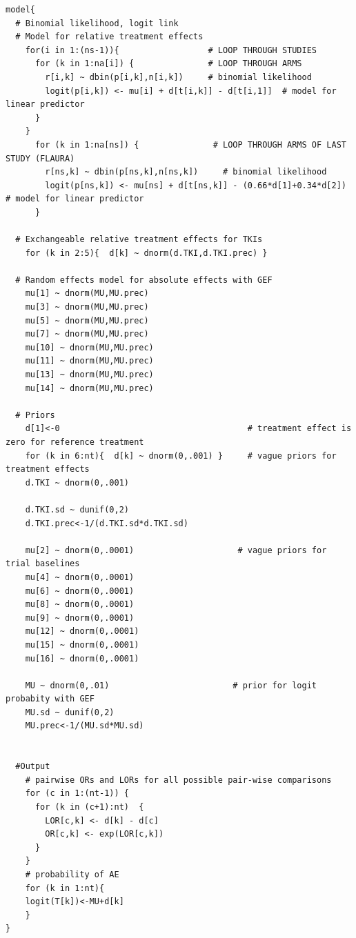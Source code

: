\documentclass[11pt,final,fleqn]{article}\usepackage[]{graphicx}\usepackage[]{color}
\theoremstyle{plain}
\begin{document}
\begin{appendices}
\begin{verbatim}
model{
  # Binomial likelihood, logit link
  # Model for relative treatment effects
    for(i in 1:(ns-1)){                  # LOOP THROUGH STUDIES
      for (k in 1:na[i]) {               # LOOP THROUGH ARMS
        r[i,k] ~ dbin(p[i,k],n[i,k])     # binomial likelihood
        logit(p[i,k]) <- mu[i] + d[t[i,k]] - d[t[i,1]]  # model for linear predictor
      }
    }   
      for (k in 1:na[ns]) {               # LOOP THROUGH ARMS OF LAST STUDY (FLAURA)
        r[ns,k] ~ dbin(p[ns,k],n[ns,k])     # binomial likelihood
        logit(p[ns,k]) <- mu[ns] + d[t[ns,k]] - (0.66*d[1]+0.34*d[2])  # model for linear predictor
      }
  
  # Exchangeable relative treatment effects for TKIs
    for (k in 2:5){  d[k] ~ dnorm(d.TKI,d.TKI.prec) }
  
  # Random effects model for absolute effects with GEF
    mu[1] ~ dnorm(MU,MU.prec) 
    mu[3] ~ dnorm(MU,MU.prec) 
    mu[5] ~ dnorm(MU,MU.prec) 
    mu[7] ~ dnorm(MU,MU.prec) 
    mu[10] ~ dnorm(MU,MU.prec) 
    mu[11] ~ dnorm(MU,MU.prec) 
    mu[13] ~ dnorm(MU,MU.prec) 
    mu[14] ~ dnorm(MU,MU.prec) 
       
  # Priors
    d[1]<-0                                      # treatment effect is zero for reference treatment
    for (k in 6:nt){  d[k] ~ dnorm(0,.001) }     # vague priors for treatment effects
    d.TKI ~ dnorm(0,.001)
    
    d.TKI.sd ~ dunif(0,2) 
    d.TKI.prec<-1/(d.TKI.sd*d.TKI.sd)
    
    mu[2] ~ dnorm(0,.0001)                     # vague priors for trial baselines
    mu[4] ~ dnorm(0,.0001)                       
    mu[6] ~ dnorm(0,.0001)                       
    mu[8] ~ dnorm(0,.0001)                       
    mu[9] ~ dnorm(0,.0001) 
    mu[12] ~ dnorm(0,.0001) 
    mu[15] ~ dnorm(0,.0001) 
    mu[16] ~ dnorm(0,.0001) 
      
    MU ~ dnorm(0,.01)                         # prior for logit probabity with GEF
    MU.sd ~ dunif(0,2) 
    MU.prec<-1/(MU.sd*MU.sd)
    
      
  #Output 
    # pairwise ORs and LORs for all possible pair-wise comparisons                                       
    for (c in 1:(nt-1)) {                        
      for (k in (c+1):nt)  { 
        LOR[c,k] <- d[k] - d[c]
        OR[c,k] <- exp(LOR[c,k])
      }  
    }
    # probability of AE
    for (k in 1:nt){ 
    logit(T[k])<-MU+d[k]
    }
}

\end{verbatim}


\end{appendices}
\end{document}

